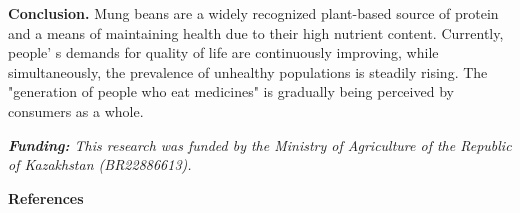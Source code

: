 \begin{multicols}{2}

{\bfseries Conclusion.} Mung beans are a widely recognized plant-based
source of protein and a means of maintaining health due to their high
nutrient content. Currently, people' s demands for
quality of life are continuously improving, while simultaneously, the
prevalence of unhealthy populations is steadily rising. The "generation
of people who eat medicines" is gradually being perceived by consumers
as a whole.

\emph{{\bfseries Funding:} This research was funded by the Ministry of
Agriculture of the Republic of Kazakhstan (BR22886613).}
\end{multicols}

\begin{center}
{\bfseries References}
\end{center}

